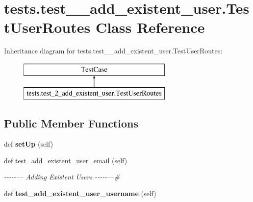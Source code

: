 \hypertarget{classtests_1_1test__2__add__existent__user_1_1_test_user_routes}{}\section{tests.\+test\+\_\+\_\+add\+\_\+existent\+\_\+user.\+Test\+User\+Routes Class Reference}
\label{classtests_1_1test__2__add__existent__user_1_1_test_user_routes}
Inheritance diagram for tests.\+test\+\_\+\_\+add\+\_\+existent\+\_\+user.\+Test\+User\+Routes\+:\begin{figure}[H]
\begin{center}
\leavevmode
\includegraphics[height=2.000000cm]{classtests_1_1test__2__add__existent__user_1_1_test_user_routes}
\end{center}
\end{figure}
\subsection*{Public Member Functions}
\begin{DoxyCompactItemize}
\item 
\mbox{\label{classtests_1_1test__2__add__existent__user_1_1_test_user_routes_a25c1a87e5087a939d9b2e515df71a387}} 
def {\bfseries set\+Up} (self)
\item 
\mbox{\label{classtests_1_1test__2__add__existent__user_1_1_test_user_routes_a8de1d56dc1f1146b054f51401ac37ae0}} 
def \hyperlink{classtests_1_1test__2__add__existent__user_1_1_test_user_routes_a8de1d56dc1f1146b054f51401ac37ae0}{test\+\_\+add\+\_\+existent\+\_\+user\+\_\+email} (self)
\begin{DoxyCompactList}\small\item\em -\/-\/-\/-\/-\/--- Adding Existent Users -\/-\/-\/-\/-\/---\# \end{DoxyCompactList}\item 
\mbox{\label{classtests_1_1test__2__add__existent__user_1_1_test_user_routes_ae1c1cf191182030649c30e21f8a53f42}} 
def {\bfseries test\+\_\+add\+\_\+existent\+\_\+user\+\_\+username} (self)
\end{DoxyCompactItemize}
